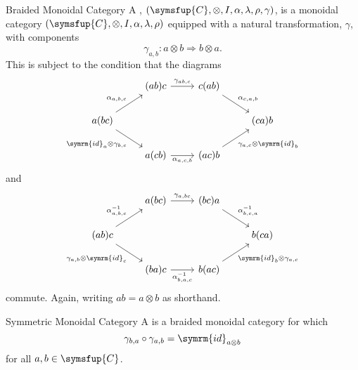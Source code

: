 \documentclass[fleqn]{NotesClass}
\newcommand{\cat}[1]{\symsfup{#1}}
\newcommand{\id}{\symrm{id}}
\newcommand{\natTrans}{\Rightarrow}
\begin{document}
    \begin{dfn}{Braided Monoidal Category}{}
        A , \((\cat{C}, \otimes, I, \alpha, \lambda, \rho, \gamma)\), is a monoidal category \((\cat{C}, \otimes, I, \alpha, \lambda, \rho)\) equipped with a natural transformation, \(\gamma\), with components
        \begin{equation}
            \gamma_{a,b} \colon a \otimes b \natTrans b \otimes a.
        \end{equation}
        This is subject to the condition that the diagrams
        \begin{equation}
            \begin{tikzcd}
                & (ab)c \arrow[r, "{\gamma_{ab,c}}"] & c(ab) \arrow[dr, "{\alpha_{c,a,b}}"]\\
                a(bc) \arrow[ur, "{\alpha_{a,b,c}}"] \arrow[dr, "{\id_a \otimes \gamma_{b,c}}"'] &&& (ca)b\\
                & a(cb) \arrow[r, "{\alpha_{a,c,b}}"'] & (ac)b \arrow[ur, "{\gamma_{a,c} \otimes \id_b}"']
            \end{tikzcd}
        \end{equation}
        and
        \begin{equation}
            \begin{tikzcd}
                & a(bc) \arrow[r, "{\gamma_{a,bc}}"] & (bc)a \arrow[dr, "{\alpha_{b,c,a}^{-1}}"]\\
                (ab)c \arrow[ur, "{\alpha_{a,b,c}^{-1}}"] \arrow[dr, "{\gamma_{a,b} \otimes \id_c}"'] &&& b(ca)\\
                & (ba)c \arrow[r, "{\alpha_{b,a,c}^{-1}}"'] & b(ac) \arrow[ur, "{\id_b \otimes \gamma_{a,c}}"']
            \end{tikzcd}
        \end{equation}
        commute.
        Again, writing \(ab = a \otimes b\) as shorthand.
    \end{dfn}
    
    \begin{dfn}{Symmetric Monoidal Category}{}
        A  is a braided monoidal category for which
        \begin{equation}
            \gamma_{b,a} \circ \gamma_{a,b} = \id_{a \otimes b}
        \end{equation}
        for all \(a, b \in \cat{C}\).
    \end{dfn}
    
\end{document}
